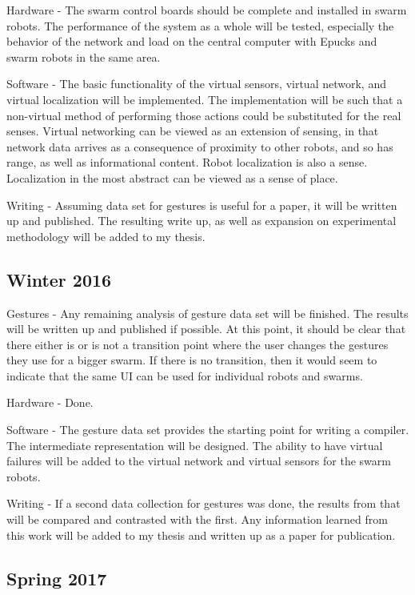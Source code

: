 \documentclass[]{article}
\begin{document}
Hardware - The swarm control boards should be complete and installed in swarm robots. The performance of the system as a whole will be tested, especially the behavior of the network and load on the central computer with Epucks and swarm robots in the same area. 

Software - The basic functionality of the virtual sensors, virtual network, and virtual localization will be implemented. 
The implementation will be such that a non-virtual method of performing those actions could be substituted for the real senses.
Virtual networking can be viewed as an extension of sensing, in that network data arrives as a consequence of proximity to other robots, and so has range, as well as informational content. 
Robot localization is also a sense. 
Localization in the most abstract can be viewed as a sense of place. 

Writing - Assuming data set for gestures is useful for a paper, it will be written up and published. The resulting write up, as well as expansion on experimental methodology will be added to my thesis. 

\subsection{Winter 2016}

Gestures - Any remaining analysis of gesture data set will be finished. 
The results will be written up and published if possible. 
At this point, it should be clear that there either is or is not a transition point where the user changes the gestures they use for a bigger swarm. 
If there is no transition, then it would seem to indicate that the same UI can be used for individual robots and swarms. 

Hardware - Done. 

Software - The gesture data set provides the starting point for writing a compiler. The intermediate representation will be designed. The ability to have virtual failures will be added to the virtual network and virtual sensors for the swarm robots. 

Writing - If a second data collection for gestures was done, the results from that will be compared and contrasted with the first. Any information learned from this work will be added to my thesis and written up as a paper for publication. 

\subsection{Spring 2017}
\end{document}

